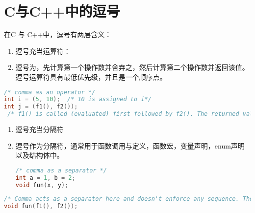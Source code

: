 \section{C与C++中的逗号}
\begin{frame}[fragile]\ft{\secname}
  在C 与 C++中，逗号有两层含义：\\[.1in]
  \begin{enumerate}
  \item[1.] 逗号充当运算符：\\[.1in]
  \item[] 逗号为，先计算第一个操作数并舍弃之，然后计算第二个操作数并返回该值。逗号运算符具有最低优先级，并且是一个顺序点。
  \end{enumerate}
\end{frame}

\begin{frame}[fragile]\ft{\secname}
    \begin{lstlisting}[language=c,backgroundcolor=\color{red!10}]
/* comma as an operator */
int i = (5, 10);  /* 10 is assigned to i*/
int j = (f1(), f2());
 /* f1() is called (evaluated) first followed by f2(). The returned value of f2() is assigned to j */    
  \end{lstlisting}
\end{frame}

\begin{frame}[fragile]\ft{\secname}
  \begin{enumerate}
  \item[2.] 逗号充当分隔符\\[.1in]
  \item[] 逗号作为分隔符，通常用于函数调用与定义，函数宏，变量声明，enum声明以及结构体中。
    \begin{lstlisting}[language=c,backgroundcolor=\color{red!10}]
/* comma as a separator */
int a = 1, b = 2;
void fun(x, y);    
\end{lstlisting}
\end{enumerate}
\end{frame}


\begin{frame}[fragile]\ft{\secname}

\begin{lstlisting}[language=c,backgroundcolor=\color{red!10}]
/* Comma acts as a separator here and doesn't enforce any sequence. Therefore, either f1() or f2() can be called first */
void fun(f1(), f2());  
\end{lstlisting}
\end{frame}

